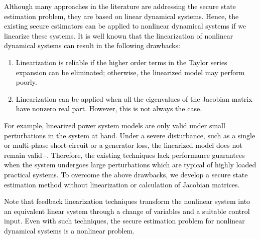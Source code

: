 \textcolor{black}{Although many approaches in the literature are addressing the secure state estimation problem, they are based
on linear dynamical systems. Hence, the existing secure estimators can be applied to nonlinear dynamical systems if we linearize these systems. It is well known that the linearization of nonlinear dynamical systems can result in the following drawbacks:
\begin{enumerate}
\item Linearization is reliable if the higher order terms in the Taylor series expansion can be eliminated; otherwise, the linearized model may perform poorly. %
\item \textcolor{black}{Linearization can be applied when all the eigenvalues of the Jacobian matrix have nonzero real part. However, this is not always the case.}
\end{enumerate}
For example, linearized power system models are only valid under small perturbations in the system at hand. Under a severe disturbance, such as a single or multi-phase short-circuit or a generator loss, the linearized model does not remain valid \cite{Kundur}-\!\!\cite{nonlin_est}. Therefore, the existing techniques lack performance guarantees when the system undergoes large perturbations which are typical of highly loaded practical systems. To overcome the above drawbacks, we develop a secure state estimation method without linearization or calculation of Jacobian matrices.} \textcolor{black}{Note that feedback linearization techniques transform the nonlinear system into an equivalent linear system through a change of variables and a suitable control input. Even with such techniques, the secure estimation problem for nonlinear dynamical systems is a nonlinear problem.}



